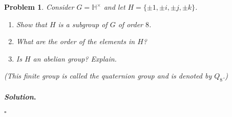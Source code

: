 \documentclass[reqno]{amsart}
\theoremstyle{plain}
\newtheorem{problem}{Problem}
\theoremstyle{definition}
\newenvironment{solution}{\paragraph{\emph{Solution}.}}{\hfill$\square$}
\begin{document}
\begin{problem}
Consider $G = \mathbb{H}^{\times}$ and let $H = \{\pm 1, \pm i, \pm j, \pm k \}$.  
\begin{enumerate}
\item Show that $H$ is a subgroup of $G$ of order $8$.
\item What are the order of the elements in $H$?
\item Is $H$ an abelian group?  Explain.
\end{enumerate}
(This finite group is called the quaternion group and is denoted by $Q_{8}$.)
\end{problem}
\begin{solution}

\end{solution}
\end{document}
